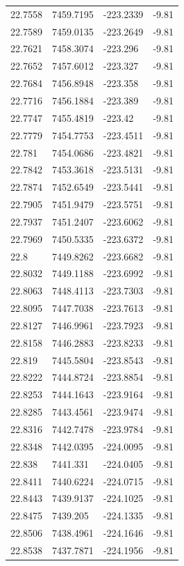 \begin{table}[H]
\begin{tabular}{llll}
22.7558 & 7459.7195 & -223.2339 & -9.81 \\
22.7589 & 7459.0135 & -223.2649 & -9.81 \\
22.7621 & 7458.3074 & -223.296 & -9.81 \\
22.7652 & 7457.6012 & -223.327 & -9.81 \\
22.7684 & 7456.8948 & -223.358 & -9.81 \\
22.7716 & 7456.1884 & -223.389 & -9.81 \\
22.7747 & 7455.4819 & -223.42 & -9.81 \\
22.7779 & 7454.7753 & -223.4511 & -9.81 \\
22.781 & 7454.0686 & -223.4821 & -9.81 \\
22.7842 & 7453.3618 & -223.5131 & -9.81 \\
22.7874 & 7452.6549 & -223.5441 & -9.81 \\
22.7905 & 7451.9479 & -223.5751 & -9.81 \\
22.7937 & 7451.2407 & -223.6062 & -9.81 \\
22.7969 & 7450.5335 & -223.6372 & -9.81 \\
22.8 & 7449.8262 & -223.6682 & -9.81 \\
22.8032 & 7449.1188 & -223.6992 & -9.81 \\
22.8063 & 7448.4113 & -223.7303 & -9.81 \\
22.8095 & 7447.7038 & -223.7613 & -9.81 \\
22.8127 & 7446.9961 & -223.7923 & -9.81 \\
22.8158 & 7446.2883 & -223.8233 & -9.81 \\
22.819 & 7445.5804 & -223.8543 & -9.81 \\
22.8222 & 7444.8724 & -223.8854 & -9.81 \\
22.8253 & 7444.1643 & -223.9164 & -9.81 \\
22.8285 & 7443.4561 & -223.9474 & -9.81 \\
22.8316 & 7442.7478 & -223.9784 & -9.81 \\
22.8348 & 7442.0395 & -224.0095 & -9.81 \\
22.838 & 7441.331 & -224.0405 & -9.81 \\
22.8411 & 7440.6224 & -224.0715 & -9.81 \\
22.8443 & 7439.9137 & -224.1025 & -9.81 \\
22.8475 & 7439.205 & -224.1335 & -9.81 \\
22.8506 & 7438.4961 & -224.1646 & -9.81 \\
22.8538 & 7437.7871 & -224.1956 & -9.81 \\

\end{tabular}
\end{table}
